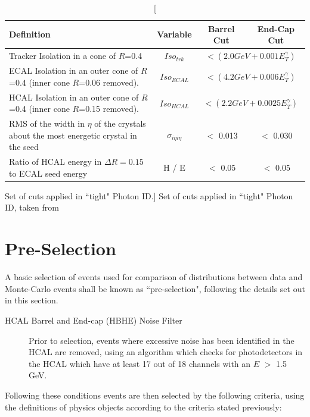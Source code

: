 \begin{table}[htbp]
\centering
\begin{tabular}{ m{6.9cm} c c c}
\hline
\hline
 \centering Definition & Variable & Barrel Cut & End-Cap Cut \\
\hline
\hline
Tracker Isolation in a cone of $R$=0.4 & $Iso_{trk}$ & \multicolumn{2}{c}{$< (2.0 GeV + 0.001E_{T}^{\gamma})$}\\
ECAL Isolation in an outer cone of $R$=0.4 (inner cone $R$=0.06 removed). & $Iso_{ECAL}$ & \multicolumn{2}{c}{$< (4.2 GeV + 0.006E_{T}^{\gamma})$}\\

HCAL Isolation in an outer cone of $R$=0.4 (inner cone $R$=0.15 removed). & $Iso_{HCAL}$ & \multicolumn{2}{c}{$< (2.2 GeV + 0.0025E_{T}^{\gamma})$}\\

RMS of the width in $\eta$ of the crystals about the most energetic crystal in the seed& $\sigma_{i \eta i \eta}$ & $<$ 0.013 & $<$ 0.030\\
Ratio of HCAL energy in $\Delta R = 0.15$ to ECAL seed energy & H / E & $<$ 0.05 & $<$ 0.05\\
\hline
\end{tabular}
\caption[Set of cuts applied in ``tight" Photon ID.]{\label{tab:pid} Set of cuts applied in ``tight" Photon ID, taken from \cite{EGM-10-006}}
\end{table}

\section{Pre-Selection}
\label{sec:press}
A basic selection of events used for comparison of distributions between data and Monte-Carlo events shall be known as ``pre-selection", following the details set out in this section.

\begin{description}


\item[HCAL Barrel and End-cap (HBHE) Noise Filter]{Prior to selection, events where excessive noise has been identified in the HCAL are removed, using an algorithm which checks for photodetectors in the HCAL which have at least 17 out of 18 channels with an $E$ $>$ 1.5 GeV.}
\end{description}
Following these conditions events are then selected by the following criteria, using the definitions of physics objects according to the criteria stated previously:

